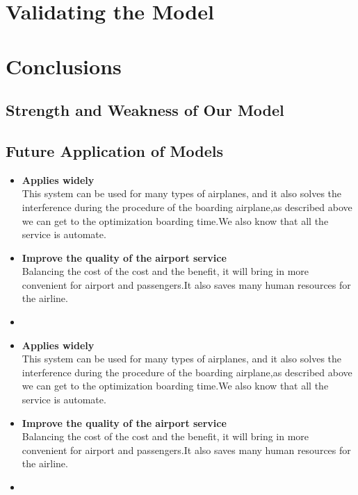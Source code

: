 \documentclass{mcmthesis}
\begin{document}
\section{Validating the Model}
\lipsum[9]

\section{Conclusions}
\subsection{Strength and Weakness of Our Model}
\subsection{Future Application of Models}

\begin{itemize}
\item \textbf{Applies widely}\\
This  system can be used for many types of airplanes, and it also
solves the interference during  the procedure of the boarding
airplane,as described above we can get to the  optimization
boarding time.We also know that all the service is automate.
\item \textbf{Improve the quality of the airport service}\\
Balancing the cost of the cost and the benefit, it will bring in
more convenient  for airport and passengers.It also saves many
human resources for the airline. \item \textbf{}
\end{itemize}

\begin{itemize}
\item \textbf{Applies widely}\\
This  system can be used for many types of airplanes, and it also
solves the interference during  the procedure of the boarding
airplane,as described above we can get to the  optimization
boarding time.We also know that all the service is automate.
\item \textbf{Improve the quality of the airport service}\\
Balancing the cost of the cost and the benefit, it will bring in
more convenient  for airport and passengers.It also saves many
human resources for the airline. \item \textbf{}
\end{itemize}
\end{document}
